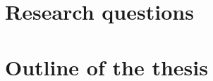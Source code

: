 

\section{Research questions}
\label{sec:research_questions}
        

\section{Outline of the thesis}
\label{sec:outline}
    